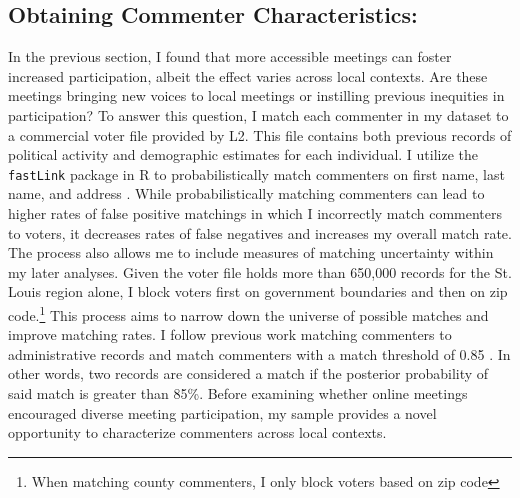 \subsection{Obtaining Commenter Characteristics:}
In the previous section, I found that more accessible meetings can foster increased participation, albeit the effect varies across local contexts. Are these meetings bringing new voices to local meetings or instilling previous inequities in participation? To answer this question, I match each commenter in my dataset to a commercial voter file provided by L2. This file contains both previous records of political activity and demographic estimates for each individual. I utilize the \texttt{fastLink} package in R to probabilistically match commenters on first name, last name, and address \citep{enamoradoUsingProbabilisticModel2019}. While probabilistically matching commenters can lead to higher rates of false positive matchings in which I incorrectly match commenters to voters, it decreases rates of false negatives and increases my overall match rate. The process also allows me to include measures of matching uncertainty within my later analyses. Given the voter file holds more than 650,000 records for the St. Louis region alone, I block voters first on government boundaries and then on zip code.\footnote{When matching county commenters, I only block voters based on zip code} This process aims to narrow down the universe of possible matches and improve matching rates. I follow previous work matching commenters to administrative records and match commenters with a match threshold of 0.85 \citep{yoderDoesPropertyOwnership2020}. In other words, two records are considered a match if the posterior probability of said match is greater than 85\%. Before examining whether online meetings encouraged diverse meeting participation, my sample provides a novel opportunity to characterize commenters across local contexts.


